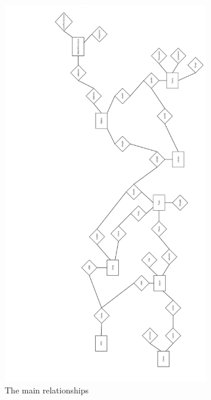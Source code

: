 \documentclass[a4paper, 12pt]{report}
\begin{document}
\begin{figure}[H]
  \centering
    \includegraphics[width=0.8\textwidth]{screenshots/database2.png}
    \caption{The main relationships}
    \label{database2}
\end{figure}
\end{document}
